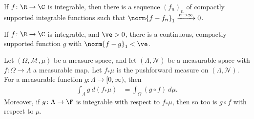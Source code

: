 \begin{corollary}
  If $f\colon \R\rightarrow\C$ is integrable, then there is a sequence $\left(f_n\right)_n$ of compactly supported integrable functions such that $\norm{f - f_n}_{1}\xrightarrow{n\rightarrow\infty} 0$.
\end{corollary}
\begin{theorem}
  If $f\colon \R\rightarrow\C$ is integrable, and $\ve > 0$, there is a continuous, compactly supported function $g$ with $\norm{f - g}_{1} < \ve$.
\end{theorem}
\begin{proposition}
  Let $\left(\Omega,\mathcal{M},\mu\right)$ be a measure space, and let $\left(\Lambda,\mathcal{N}\right)$ be a measurable space with $f\colon \Omega\rightarrow \Lambda$ a measurable map. Let $f_{\ast}\mu$ is the pushforward measure on $\left(\Lambda,\mathcal{N}\right)$. For a measurable function $g\colon \Lambda\rightarrow [0,\infty)$, then
  \begin{align*}
    \int_{\Lambda}^{} g\:d\left(f_{\ast}\mu\right) &= \int_{\Omega}^{} \left(g\circ f\right)\:d\mu.
  \end{align*}
  Moreover, if $g\colon \Lambda\rightarrow \F$ is integrable with respect to $f_{\ast}\mu$, then so too is $g\circ f$ with respect to $\mu$.
\end{proposition}
